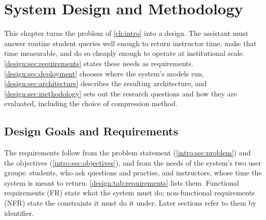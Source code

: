 \chapter{System Design and Methodology}
\label{ch:design}
\vspace{2em}

This chapter turns the problem of \autoref{ch:intro} into a design. The
assistant must answer routine student queries well enough to return
instructor time, make that time measurable, and do so cheaply enough to operate at
institutional scale. \autoref{design:sec:requirements} states these needs as
requirements. \autoref{design:sec:deployment} chooses where the system's models
run, \autoref{design:sec:architecture} describes the resulting architecture,
and \autoref{design:sec:methodology} sets out the research questions and how
they are evaluated, including the choice of compression method.

\section{Design Goals and Requirements}
\label{design:sec:requirements}

The requirements follow from the problem statement (\autoref{intro:sec:problem})
and the objectives (\autoref{intro:sec:objectives}), and from the needs of the
system's two user groups: students, who ask questions and practise, and
instructors, whose time the system is meant to return.
\autoref{design:tab:requirements} lists them. Functional requirements (FR)
state what the system must do; non-functional requirements (NFR) state the
constraints it must do it under. Later sections refer to them by identifier.

